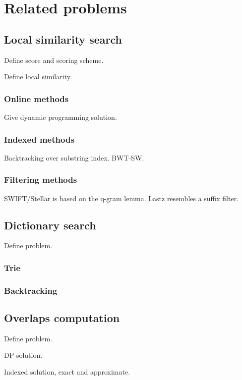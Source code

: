 
\section{Related problems}


\subsection{Local similarity search}

Define score and scoring scheme.

Define local similarity.

\subsubsection{Online methods}
Give dynamic programming solution.

\subsubsection{Indexed methods}
Backtracking over substring index. BWT-SW.

\subsubsection{Filtering methods}
SWIFT/Stellar is based on the q-gram lemma.
Lastz resembles a suffix filter.



\subsection{Dictionary search}

Define problem.

\subsubsection{Trie}

\subsubsection{Backtracking}


\subsection{Overlaps computation}

Define problem.

DP solution.

Indexed solution, exact and approximate.

